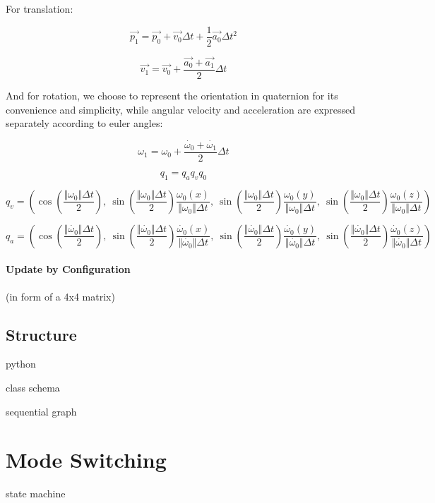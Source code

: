 For translation:

\[
\overrightarrow{p_{1}}=\overrightarrow{p_{0}}+\overrightarrow{v_{0}}\Delta t+\frac{1}{2}\overrightarrow{a_{0}}\Delta t^{2}
\]

\[
\overrightarrow{v_{1}}=\overrightarrow{v_{0}}+\frac{\overrightarrow{a_{0}}+\overrightarrow{a_{1}}}{2}\Delta t
\]

And for rotation, we choose to represent the orientation in quaternion for its convenience and simplicity, while angular velocity and acceleration are expressed separately according to euler angles:

\[
\omega_{1}=\omega_{0}+\frac{\dot{\omega_{0}}+\dot{\omega_{1}}}{2}\Delta t
\]

\[
q_{1}=q_{a}q_{v}q_{0}
\]

\[
q_{v}=\left(\cos(\frac{\Vert\omega_{0}\Vert\Delta t}{2}),\:\sin(\frac{\Vert\omega_{0}\Vert\Delta t}{2})\frac{\omega_{0}(x)}{\Vert\omega_{0}\Vert\Delta t},\:\sin(\frac{\Vert\omega_{0}\Vert\Delta t}{2})\frac{\omega_{0}(y)}{\Vert\omega_{0}\Vert\Delta t},\:\sin(\frac{\Vert\omega_{0}\Vert\Delta t}{2})\frac{\omega_{0}(z)}{\Vert\omega_{0}\Vert\Delta t}\right)
\]

\[
q_{a}=\left(\cos(\frac{\Vert\dot{\omega_{0}}\Vert\Delta t}{2}),\:\sin(\frac{\Vert\dot{\omega_{0}}\Vert\Delta t}{2})\frac{\dot{\omega_{0}}(x)}{\Vert\dot{\omega_{0}}\Vert\Delta t},\:\sin(\frac{\Vert\dot{\omega_{0}}\Vert\Delta t}{2})\frac{\dot{\omega_{0}}(y)}{\Vert\dot{\omega_{0}}\Vert\Delta t},\:\sin(\frac{\Vert\dot{\omega_{0}}\Vert\Delta t}{2})\frac{\dot{\omega_{0}}(z)}{\Vert\dot{\omega_{0}}\Vert\Delta t}\right)
\]


\paragraph{Update by Configuration}
(in form of a 4x4 matrix)



\subsection{Structure}

python

class schema

sequential graph


\section{Mode Switching}
state machine


